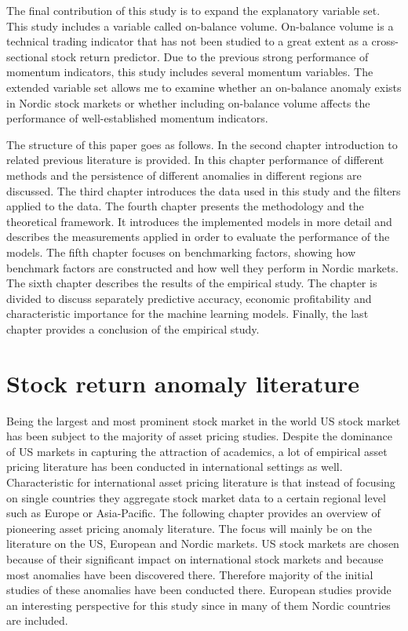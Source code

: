 \documentclass[12pt]{article}
\begin{document}
The final contribution of this study is to expand the explanatory variable set. This study includes a variable called on-balance volume. On-balance volume is a technical trading indicator that has not been studied to a great extent as a cross-sectional stock return predictor. Due to the previous strong performance of momentum indicators, this study includes several momentum variables. The extended variable set allows me to examine whether an on-balance anomaly exists in Nordic stock markets or whether including on-balance volume affects the performance of well-established momentum indicators. \par

The structure of this paper goes as follows. In the second chapter introduction to related previous literature is provided. In this chapter performance of different methods and the persistence of different anomalies in different regions are discussed. The third chapter introduces the data used in this study and the filters applied to the data. The fourth chapter presents the methodology and the theoretical framework. It introduces the implemented models in more detail and describes the measurements applied in order to evaluate the performance of the models. The fifth chapter focuses on benchmarking factors, showing how benchmark factors are constructed and how well they perform in Nordic markets. The sixth chapter describes the results of the empirical study. The chapter is divided to discuss separately predictive accuracy, economic profitability and characteristic importance for the machine learning models. Finally, the last chapter provides a conclusion of the empirical study. \par

\section{Stock return anomaly literature}\label{StockReturnAnomalyLiterature}

Being the largest and most prominent stock market in the world US stock market has been subject to the majority of asset pricing studies. Despite the dominance of US markets in capturing the attraction of academics, a lot of empirical asset pricing literature has been conducted in international settings as well. Characteristic for international asset pricing literature is that instead of focusing on single countries they aggregate stock market data to a certain regional level such as Europe or Asia-Pacific. The following chapter provides an overview of pioneering asset pricing anomaly literature. The focus will mainly be on the literature on the US, European and Nordic markets. US stock markets are chosen because of their significant impact on international stock markets and because most anomalies have been discovered there. Therefore majority of the initial studies of these anomalies have been conducted there. European studies provide an interesting perspective for this study since in many of them Nordic countries are included. \par
\end{document}
